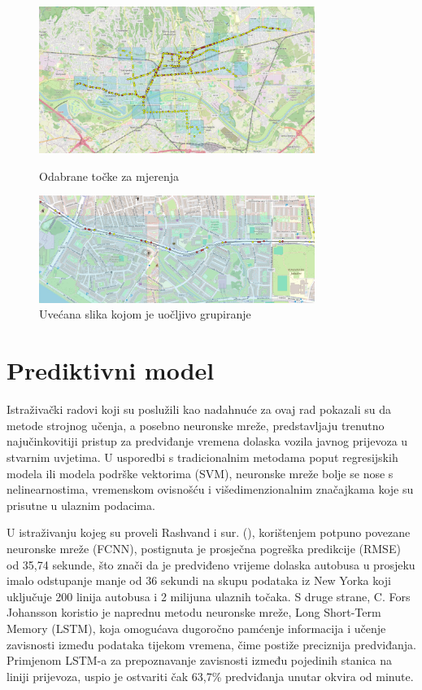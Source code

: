 \documentclass[seminarskirad]{fer}
\begin{document}
\begin{figure}[h]
	\centering
	\includegraphics[width=0.8\textwidth]{Figures/odabrane-tocke.png}
	\caption{Odabrane točke za mjerenja}
	\label{slk:odabrane}
	
	\vspace{1em}
	
	\includegraphics[width=0.8\textwidth]{Figures/odabrane-tocke-zoom.png}
	\caption{Uvećana slika kojom je uočljivo grupiranje}
	\label{slk:odabrane-zoom}
\end{figure}


\chapter{Prediktivni model}
\label{pog:prediktivni}
Istraživački radovi  koji su poslužili kao nadahnuće za ovaj rad pokazali su da metode strojnog učenja, a posebno neuronske mreže, predstavljaju trenutno najučinkovitiji pristup za predviđanje vremena dolaska vozila javnog prijevoza u stvarnim uvjetima. U usporedbi s tradicionalnim metodama poput regresijskih modela ili modela podrške vektorima (SVM), neuronske mreže bolje se nose s nelinearnostima, vremenskom ovisnošću i višedimenzionalnim značajkama koje su prisutne u ulaznim podacima\cite{article1}\cite{article2}.

U istraživanju kojeg su proveli Rashvand i sur. (\cite{article1}), korištenjem potpuno povezane neuronske mreže (FCNN), postignuta je prosječna pogreška predikcije (RMSE) od 35,74 sekunde, što znači da je predviđeno vrijeme dolaska autobusa u prosjeku imalo odstupanje manje od 36 sekundi na skupu podataka iz New Yorka koji uključuje 200 linija autobusa i 2 milijuna ulaznih točaka. S druge strane, C. Fors Johansson koristio je naprednu metodu neuronske mreže, Long Short-Term Memory (LSTM), koja omogućava dugoročno pamćenje informacija i učenje zavisnosti između podataka tijekom vremena, čime postiže preciznija predviđanja. Primjenom LSTM-a za prepoznavanje zavisnosti između pojedinih stanica na liniji prijevoza, uspio je ostvariti čak 63,7\% predviđanja unutar okvira od  minute\cite{article3}.
\end{document}
